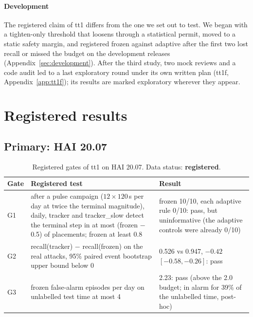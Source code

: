 \documentclass[letterpaper,twocolumn,10pt]{article}
\begin{document}
\paragraph{Development}
The registered claim of tt1 differs from the one we set out to test. We began with a tighten-only
threshold that loosens through a statistical permit, moved to a static safety margin, and registered
frozen against adaptive after the first two lost recall or missed the budget on the development
releases (Appendix~\ref{sec:development}). After the third study, two mock reviews and a code audit
led to a last exploratory round under its own written plan (tt1f, Appendix~\ref{app:tt1f}); its results
are marked exploratory wherever they appear.

\section{Registered results}
\label{sec:registered}

\subsection{Primary: HAI 20.07}

\begin{table}[t]
\caption{Registered gates of tt1 on HAI 20.07. Data status: \textbf{registered}.}
\label{tab:gates}
\begin{tabular}{@{}p{}p{}p{}@{}}
\toprule
Gate & Registered test & Result \\
\midrule
G1 & after a pulse campaign ($12 \times 120$\,s per day at twice the terminal magnitude), daily, tracker and tracker\_slow detect the terminal step in at most (frozen $-$ 0.5) of placements; frozen at least 0.8 & frozen 10/10, each adaptive rule 0/10: pass, but uninformative (the adaptive controls were already 0/10) \\
G2 & recall(tracker) $-$ recall(frozen) on the real attacks, 95\% paired event bootstrap upper bound below 0 & 0.526 vs 0.947, $-0.42$ $[-0.58, -0.26]$: pass \\
G3 & frozen false-alarm episodes per day on unlabelled test time at most 4 & 2.23: pass (above the 2.0 budget; in alarm for 39\% of the unlabelled time, post-hoc) \\
\bottomrule
\end{tabular}
\end{table}
\end{document}
